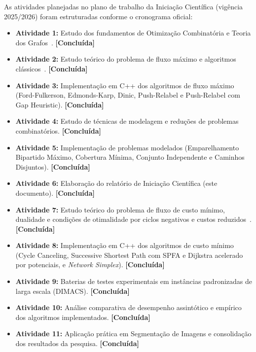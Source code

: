 As atividades planejadas no plano de trabalho da Iniciação Científica (vigência 2025/2026) foram estruturadas conforme o cronograma oficial:

\begin{itemize}[leftmargin=1.5em, itemsep=0.15em, topsep=0.2em, parsep=0em]
    \item \textbf{Atividade 1:} Estudo dos fundamentos de Otimização Combinatória e Teoria dos Grafos~\cite{cook1998combinatorial}. \textbf{[Concluída]}
    \item \textbf{Atividade 2:} Estudo teórico do problema de fluxo máximo e algoritmos clássicos~\cite{ford1956maximal, edmonds1972theoretical, dinic1970algorithm, goldberg1988new}. \textbf{[Concluída]}
    \item \textbf{Atividade 3:} Implementação em C++ dos algoritmos de fluxo máximo (Ford-Fulkerson, Edmonds-Karp, Dinic, Push-Relabel e Push-Relabel com Gap Heuristic). \textbf{[Concluída]}
    \item \textbf{Atividade 4:} Estudo de técnicas de modelagem e reduções de problemas combinatórios. \textbf{[Concluída]}
    \item \textbf{Atividade 5:} Implementação de problemas modelados (Emparelhamento Bipartido Máximo, Cobertura Mínima, Conjunto Independente e Caminhos Disjuntos). \textbf{[Concluída]}
    \item \textbf{Atividade 6:} Elaboração do relatório de Iniciação Científica (este documento). \textbf{[Concluída]}
    \item \textbf{Atividade 7:} Estudo teórico do problema de fluxo de custo mínimo, dualidade e condições de otimalidade por ciclos negativos e custos reduzidos~\cite{ahuja1993network}. \textbf{[Concluída]}
    \item \textbf{Atividade 8:} Implementação em C++ dos algoritmos de custo mínimo (Cycle Canceling, Successive Shortest Path com SPFA e Dijkstra acelerado por potenciais, e \textit{Network Simplex}). \textbf{[Concluída]}
    \item \textbf{Atividade 9:} Baterias de testes experimentais em instâncias padronizadas de larga escala (DIMACS). \textbf{[Concluída]}
    \item \textbf{Atividade 10:} Análise comparativa de desempenho assintótico e empírico dos algoritmos implementados. \textbf{[Concluída]}
    \item \textbf{Atividade 11:} Aplicação prática em Segmentação de Imagens e consolidação dos resultados da pesquisa. \textbf{[Concluída]}
\end{itemize}

